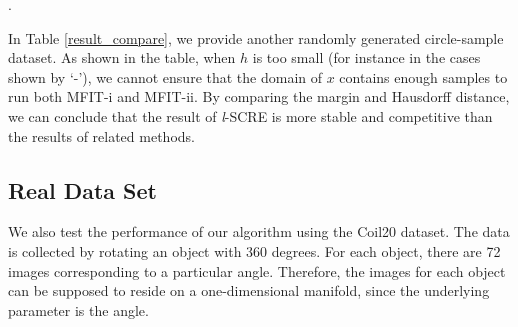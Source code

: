 \documentclass[aos,preprint]{imsart}
\theoremstyle{remark}
\begin{document}
\begin{table}[h]
\caption{The margin and Hausdorff between $\cal \hat{G}$ and $\mathcal M$ vary with $h$ for SCRE, {\it l}-SCRE, MFIT-i and MFIT-ii on the 2-dimensional sphere}.
\end{table}

In Table \ref{result_compare}, we provide another randomly generated circle-sample dataset. As shown in the table, when $h$ is too small (for instance in the cases shown by `-'), we cannot ensure that the domain of $x$ contains enough samples to run both MFIT-i and MFIT-ii. By comparing the margin and Hausdorff distance, we can conclude that the result of {\it l}-SCRE is more stable and competitive than the results of related methods.



\subsection{Real Data Set}
We also test the performance of our algorithm using the Coil20 \cite{Coil20} dataset. The data is collected by rotating an object with 360 degrees. For each object, there are 72 images corresponding to a particular angle. Therefore, the images for each object can be supposed to reside on a one-dimensional manifold, since the underlying parameter is the angle.
\end{document}
